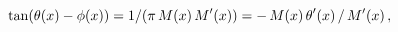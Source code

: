 \[\mathop{\tan\/}\nolimits\!\left(\mathop{\theta\/}\nolimits\!\left(x\right)-%
\mathop{\phi\/}\nolimits\!\left(x\right)\right)=1/(\pi\mathop{M\/}\nolimits\!%
\left(x\right)\mathop{M\/}\nolimits'\!\left(x\right))=-\mathop{M\/}\nolimits\!%
\left(x\right)\mathop{\theta\/}\nolimits'\!\left(x\right)/\mathop{M\/}%
\nolimits'\!\left(x\right),\]